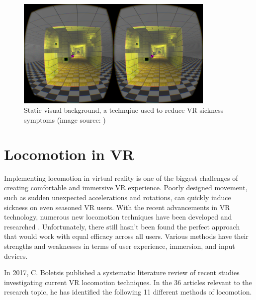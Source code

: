 \begin{figure}[th]
\centering
\includegraphics[width=0.85\textwidth]{img/static_background.png}
\caption{Static visual background, a technqiue used to reduce VR sickness symptoms (image source: \cite{STATICBACKGROUND})}
\label{fig:STATIC_BACKGROUND}
\end{figure}

\section{Locomotion in VR}
Implementing locomotion in virtual reality is one of the biggest challenges of creating comfortable and immersive VR experience. Poorly designed movement, such as sudden unexpected accelerations and rotations, can quickly induce sickness on even seasoned VR users. With the recent advancements in VR technology, numerous new locomotion techniques have been developed and researched \cite{VRHCI}. Unfortunately, there still hasn't been found the perfect approach that would work with equal efficacy across all users. Various methods have their strengths and weaknesses in terms of user experience, immersion, and input devices. 

In 2017, C. Boletsis published a systematic literature review \cite{LOCOMOTIONREVIEW} of recent studies investigating current VR locomotion techniques. In the 36 articles relevant to the research topic, he has identified the following 11 different methods of locomotion. 

